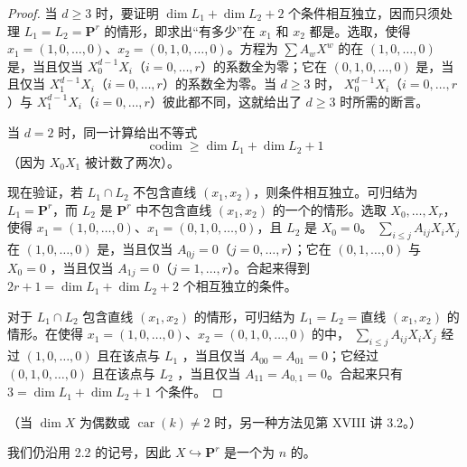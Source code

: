 \begin{proof}
当 $d\geq3$ 时，要证明 $\dim L_1+\dim L_2+2$ 个条件相互独立，因而只须处理 $L_1=L_2=\mathbf P^r$ 的情形，即求出“有多少”在 $x_1$ 和 $x_2$ 都是。选取，使得
$x_1=(1,0,\ldots,0)$、$x_2=(0,1,0,\ldots,0)$。方程为 $\sum A_wX^w$ 的在 $(1,0,\ldots,0)$ 是，当且仅当
$X_0^{d-1}X_i$（$i=0,\ldots,r$）的系数全为零；它在 $(0,1,0,\ldots,0)$ 是，当且仅当 $X_1^{d-1}X_i$（$i=0,\ldots,r$）的系数全为零。当 $d\geq3$ 时，
$X_0^{d-1}X_i$（$i=0,\ldots,r$）与 $X_1^{d-1}X_i$（$i=0,\ldots,r$）彼此都不同，这就给出了 $d\geq3$ 时所需的断言。

当 $d=2$ 时，同一计算给出不等式
\[
\operatorname{codim}\geq\dim L_1+\dim L_2+1
\]
（因为 $X_0X_1$ 被计数了两次）。

现在验证，若 $L_1\cap L_2$ 不包含直线 $(x_1,x_2)$，则条件相互独立。可归结为 $L_1=\mathbf P^r$，而 $L_2$ 是 $\mathbf P^r$ 中不包含直线 $(x_1,x_2)$ 的一个的情形。选取 $X_0,\ldots,X_r$，使得
$x_1=(1,0,\ldots,0)$、$x_1=(0,1,0,\ldots,0)$，且 $L_2$ 是 $X_0=0$。 $\sum_{i\leq j}A_{ij}X_iX_j$ 在 $(1,0,\ldots,0)$ 是，当且仅当 $A_{0j}=0$（$j=0,\ldots,r$）；它在 $(0,1,\ldots,0)$ 与
$X_0=0$ ，当且仅当 $A_{1j}=0$（$j=1,\ldots,r$）。合起来得到 $2r+1=\dim L_1+\dim L_2+2$ 个相互独立的条件。

对于 $L_1\cap L_2$ 包含直线 $(x_1,x_2)$ 的情形，可归结为 $L_1=L_2=\text{直线 }(x_1,x_2)$ 的情形。在使得 $x_1=(1,0,\ldots,0)$、$x_2=(0,1,0,\ldots,0)$ 的中， $\sum_{i\leq j}A_{ij}X_iX_j$ 经过 $(1,0,\ldots,0)$ 且在该点与 $L_1$ ，当且仅当 $A_{00}=A_{01}=0$；它经过 $(0,1,0,\ldots,0)$ 且在该点与 $L_2$ ，当且仅当 $A_{11}=A_{0,1}=0$。合起来只有 $3=\dim L_1+\dim L_2+1$ 个条件。
\end{proof}

（当 $\dim X$ 为偶数或 $\operatorname{car}(k)\ne2$ 时，另一种方法见第 XVIII 讲 3.2。）

我们仍沿用 2.2 的记号，因此 $X\hookrightarrow\mathbf P^r$ 是一个为 $n$ 的。

